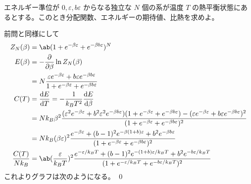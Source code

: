 \documentclass[uplatex,dvipdfmx,a4paper,11pt]{jlreq}
\makeatletter
\numberwithin{equation}{section}
\theoremstyle{definition}
\renewenvironment{proof}[1][\proofname]{\par
  \normalfont
  \topsep6\p@\@plus6\p@ \trivlist
  \item[\hskip\labelsep{\bfseries #1}\@addpunct{\bfseries}]\ignorespaces\quad\par
}{%
  \qed\endtrivlist\@endpefalse
}
\renewcommand\proofname{証明}
\makeatother
\begin{document}
\begin{problem}
エネルギー準位が $0, \varepsilon, b\varepsilon$ からなる独立な $N$ 個の系が温度 $T$ の熱平衡状態にあるとする。このとき分配関数、エネルギーの期待値、比熱を求めよ。
\end{problem}
\begin{proof}
  前問と同様にして
  \begin{align}
    Z_N(\beta)        & = \ab(1 + e^{-\beta\varepsilon} + e^{-\beta b\varepsilon})^N                                                                                                                                                                                                                                      \\
    E(\beta)          & = -\diffp{}{\beta}\ln Z_N(\beta)                                                                                                                                                                                                                                                                  \\
                      & = N\frac{\varepsilon e^{-\beta\varepsilon} + b\varepsilon e^{-\beta b\varepsilon}}{1 + e^{-\beta\varepsilon} + e^{-\beta b\varepsilon}}                                                                                                                                                           \\
    C(T)              & = \diff{E}{T} = -\frac{1}{k_BT^2}\diff{E}{\beta}                                                                                                                                                                                                                                                  \\
                      & = Nk_B\beta^2\frac{(\varepsilon^2 e^{-\beta\varepsilon} + b^2\varepsilon^2 e^{-\beta b\varepsilon})(1 + e^{-\beta\varepsilon} + e^{-\beta b\varepsilon}) - (\varepsilon e^{-\beta\varepsilon} + b\varepsilon e^{-\beta b\varepsilon})^2}{(1 + e^{-\beta\varepsilon} + e^{-\beta b\varepsilon})^2} \\
                      & = Nk_B(\beta\varepsilon)^2\frac{e^{-\beta\varepsilon} + (b - 1)^2e^{-\beta(1 + b)\varepsilon} + b^2e^{-\beta b\varepsilon}}{(1 + e^{-\beta\varepsilon} + e^{-\beta b\varepsilon})^2}                                                                                                              \\
    \frac{C(T)}{Nk_B} & = \ab(\frac{\varepsilon}{k_BT})^2\frac{e^{-\varepsilon/k_BT} + (b - 1)^2e^{-(1 + b)\varepsilon/k_BT} + b^2e^{-b\varepsilon/k_BT}}{(1 + e^{-\varepsilon/k_BT} + e^{-b\varepsilon/k_BT})^2}
  \end{align}
  これよりグラフは次のようになる。
\end{proof}
\clearpage
\end{document}
